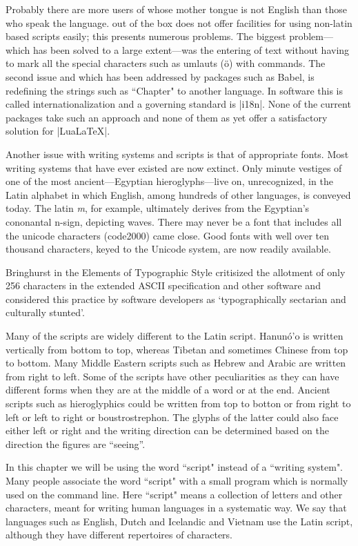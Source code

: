  
Probably there are more users of \latexe whose mother tongue is not English than those who speak the language. \tex out of the box does not offer facilities for using non-latin based scripts easily; this presents numerous problems. The biggest problem---which has been solved to a large extent---was the entering of text without having to mark all the special
characters such as umlauts (\"o) with commands. The second issue and which has been addressed by packages such as Babel, is redefining the strings such as ``Chapter" to another language. In software this is called internationalization and a governing standard is |i18n|. None of the current packages take such an approach and none of them as yet offer a satisfactory solution for |LuaLaTeX|. 



Another issue with writing systems and scripts is that of appropriate fonts. Most writing systems that have ever existed are now extinct. Only minute vestiges of one of the most ancient---Egyptian hieroglyphs---live on, unrecognized, in the Latin alphabet in which English, among hundreds of other languages, is conveyed today. The latin \textit{m}, for example, ultimately derives from the Egyptian's cononantal n-sign, depicting waves. There may never be a font that includes all the unicode characters (code2000) came close. Good fonts with well over ten thousand characters, keyed to the Unicode system, are now readily available. 

Bringhurst in the Elements of Typographic Style \citeyearpar{Bringhurst2005} critisized the allotment of only 256 characters in the extended ASCII specification and other software and considered this practice by software developers as `typographically sectarian and culturally stunted’. 


Many of the scripts are widely different to the Latin script. Hanunó'o is written vertically from bottom to top, whereas Tibetan and sometimes Chinese from top to bottom. Many Middle Eastern scripts such as Hebrew and Arabic are written from right to left. Some of the scripts have other peculiarities as they can have different forms when they are at the middle of a word or at the end. Ancient scripts such as hieroglyphics could be written from top to botton or from right to left or left to right or boustrostrephon. The glyphs of the latter could also face either left or right and the writing direction can be determined based on the direction the figures are ``seeing''. 

In this chapter we will be using the word ``script" instead of a ``writing system". Many people associate the word ``script" with a small program which is normally used on the command line. Here ``script" means a collection of letters and other characters, meant for writing human languages in a systematic way.  We say that languages such as English, Dutch and Icelandic and Vietnam use the Latin script, although they have different repertoires of characters.


